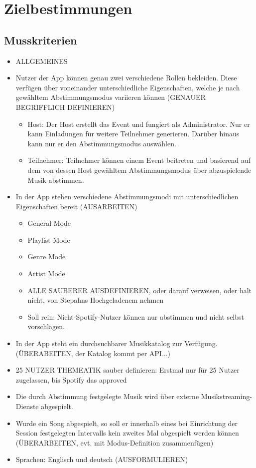 \documentclass[oneside, ngerman]{sdqtechreport}
\begin{document}
\chapter{Zielbestimmungen}
\label{chap:Zielbestimmungen}

\section{Musskriterien}
\label{sec:Zielbestimmungen:Musskriterien}
\begin{itemize}
    \item ALLGEMEINES
    \item Nutzer der App können genau zwei verschiedene Rollen bekleiden. Diese verfügen über voneinander unterschiedliche Eigenschaften, welche je nach gewähltem Abstimmungsmodus variieren können (GENAUER BEGRIFFLICH DEFINIEREN)
    \begin{itemize}
        \item Host: Der Host erstellt das Event und fungiert als Administrator. Nur er kann Einladungen für weitere Teilnehmer generieren. Darüber hinaus kann nur er den Abstimmungsmodus auswählen.
        \item Teilnehmer: Teilnehmer können einem Event beitreten und basierend auf dem von dessen Host gewähltem Abstimmungsmodus über abzuspielende Musik abstimmen.
    \end{itemize}
    \item In der App stehen verschiedene Abstimmungsmodi mit unterschiedlichen Eigenschaften bereit (AUSARBEITEN)
    \begin{itemize}
        \item General Mode
        \item Playlist Mode
        \item Genre Mode
        \item Artist Mode
        \item ALLE SAUBERER AUSDEFINIEREN, oder darauf verweisen, oder halt nicht, von Stepahns Hochgeladenem nehmen
        \item Soll rein: Nicht-Spotify-Nutzer können nur abstimmen und nicht selbst vorschlagen.
    \end{itemize}
    \item In der App steht ein durchsuchbarer Musikkatalog zur Verfügung. (ÜBERABEITEN, der Katalog kommt per API...)
    \item 25 NUTZER THEMEATIK sauber definieren: Erstmal nur für 25 Nutzer zugelassen, bis Spotify das approved
    \item Die durch Abstimmung festgelegte Musik wird über externe Musikstreaming-Dienste abgespielt.
    \item Wurde ein Song abgespielt, so soll er innerhalb eines bei Einrichtung der Session festgelegten Intervalls kein zweites Mal abgespielt werden können (ÜBERARBEITEN, evt. mit Modus-Definition zusammenfügen)
    \item Sprachen: Englisch und deutsch (AUSFORMULIEREN)

\end{itemize}
\end{document}
